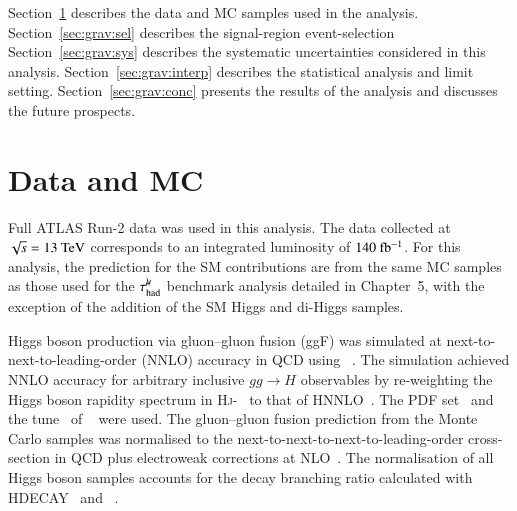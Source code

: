     Section~\ref{sec:data_mc} describes the data and MC samples used in the analysis.
    Section~\ref{sec:grav:sel} describes the signal-region event-selection
    Section~\ref{sec:grav:sys} describes the systematic uncertainties considered in this analysis.
    Section~\ref{sec:grav:interp} describes the statistical analysis and limit setting.
    Section~\ref{sec:grav:conc} presents the results of the analysis and discusses the future prospects.


\section{Data and MC} \label{sec:data_mc}
    Full ATLAS Run-2 data was used in this analysis. The data collected at $\sqrt{s} = 13~\text{TeV}$ corresponds to an integrated luminosity of $140~\mbox{fb\(^{-1}\)}$. 
    For this analysis, the prediction for the SM contributions are from the same MC samples as those used for the $\tau_\mathrm{had}^{\mu\mkern-10mu\backslash}$ benchmark analysis detailed 
    in Chapter~5, with the exception of the addition of the SM Higgs and di-Higgs samples. 

    Higgs boson production via gluon--gluon fusion (ggF) was simulated at next-to-next-to-leading-order (NNLO) accuracy in 
    QCD using \POWHEGBOX[v2]~\cite{Hamilton:2013fea,Hamilton:2015nsa,Alioli:2010xd,Nason:2004rx,Frixione:2007vw}. 
    The simulation achieved NNLO accuracy for arbitrary inclusive $gg\to H$ observables by re-weighting the Higgs boson 
    rapidity spectrum in \textsc{Hj}-\MINLO~\cite{Hamilton:2012np,Campbell:2012am,Hamilton:2012rf} to that of HNNLO~\cite{Catani:2007vq}.
    The \PDFforLHC[15nnlo] PDF set~\cite{Butterworth:2015oua} and the \AZNLO tune~\cite{STDM-2012-23} 
    of \PYTHIA[8]~\cite{Sjostrand:2014zea} were used.
    The gluon--gluon fusion prediction from the Monte Carlo samples was normalised to the 
    next-to-next-to-next-to-leading-order cross-section in QCD plus electroweak corrections 
    at NLO~\cite{deFlorian:2016spz,Anastasiou:2016cez,Anastasiou:2015ema,Dulat:2018rbf,Harlander:2009mq,Harlander:2009bw,Harlander:2009my,Pak:2009dg,Actis:2008ug,Actis:2008ts,Bonetti:2018ukf,Bonetti:2018ukf}. 
    The normalisation of all Higgs boson
    samples accounts for the decay branching ratio calculated with HDECAY~\cite{Djouadi:1997yw,Spira:1997dg,Djouadi:2006bz}
    and \PROPHECY~\cite{Bredenstein:2006ha,Bredenstein:2006rh,Bredenstein:2006nk}.

